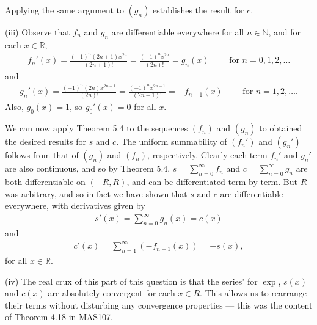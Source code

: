 \documentclass[letterpaper,10pt,english]{jupyterBook}
\begin{document}
Applying the same argument to \((g_n)\) establishes the result for \(c\).

\sphinxAtStartPar
(iii) Observe that \(f_n\) and \(g_n\) are differentiable everywhere for all \(n\in\mathbb{N}\), and for each \(x\in\mathbb{R}\),
\begin{equation*}
\begin{split}
f_n'(x) = \frac{(-1)^n(2n+1)x^{2n}}{(2n+1)!}=\frac{(-1)^nx^{2n}}{(2n)!}=g_n(x) \hspace{2em} \text{ for } n=0,1,2,\ldots
\end{split}
\end{equation*}
\sphinxAtStartPar
and
\begin{equation*}
\begin{split}
g_n'(x) = \frac{(-1)^n(2n)x^{2n-1}}{(2n)!} = \frac{(-1)^nx^{2n-1}}{(2n-1)!} = -f_{n-1}(x) \hspace{2em} \text{ for } n=1,2,\ldots.
\end{split}
\end{equation*}
\sphinxAtStartPar
Also, \(g_0(x)=1\), so \(g_0'(x)=0\) for all \(x\).

We can now apply Theorem 5.4 to the sequences \((f_n)\) and \((g_n)\) to obtained the desired results for \(s\) and \(c\). The uniform summability of \((f_n')\) and \((g_n')\) follows from that of \((g_n)\) and \((f_n)\), respectively. Clearly each term \(f_n'\) and \(g_n'\) are also continuous, and so by Theorem 5.4, \(s=\sum_{n=0}^\infty f_n\) and \(c=\sum_{n=0}^\infty g_n\) are both differentiable on \((-R,R)\), and can be differentiated term by term. But \(R\) was arbitrary, and so in fact we have shown that \(s\) and \(c\) are differentiable everywhere, with derivatives given by
\begin{equation*}
\begin{split}
s'(x) = \sum_{n=0}^\infty g_n(x) = c(x)
\end{split}
\end{equation*}
\sphinxAtStartPar
and
\begin{equation*}
\begin{split}
c'(x) = \sum_{n=1}^\infty (-f_{n-1}(x)) = -s(x),
\end{split}
\end{equation*}
\sphinxAtStartPar
for all \(x\in\mathbb{R}\).

\sphinxAtStartPar
(iv) The real crux of this part of this question is that the series’ for \(\exp\), \(s(x)\) and \(c(x)\) are absolutely convergent for each \(x\in R\). This allows us to rearrange their terms without disturbing any convergence properties — this was the content of Theorem 4.18 in MAS107.
\end{document}
